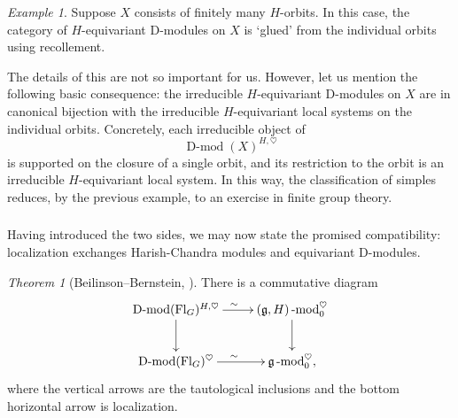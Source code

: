\documentclass[10pt]{amsart}
\newcommand{\sB}{\on{Fl}_G}
\newcommand{\fg}{\mathfrak{g}}
\newcommand{\on}{\operatorname}
\renewcommand{\mod}{\on{-mod}}
\newcommand{\Dmod}{\on{D-mod}}
\theoremstyle{remark}
\newtheorem{ex}[subsubsection]{Example}
\newcommand{\sS}{\mathscr{S}}
\newtheorem{theo}[subsubsection]{Theorem}
\numberwithin{equation}{section}
\renewcommand{\mod}{\operatorname{-mod}}
\begin{document}
	\begin{ex} Suppose $X$ consists of finitely many $H$-orbits. 
	In this case, the category of $H$-equivariant D-modules on $X$ is `glued' 
	from the individual orbits using recollement.
	
	The details of this are not so important for us. However, let us mention 
	the following basic consequence: the irreducible $H$-equivariant 
	D-modules on $X$ are in canonical bijection with the irreducible 
	$H$-equivariant local systems on the individual orbits. Concretely, each 
	irreducible object of $$\Dmod(X)^{H, \heartsuit}$$is supported on the 
	closure of a single orbit, and its restriction to the orbit is an 
	irreducible $H$-equivariant local system. In this way, the classification 
	of simples reduces, by the previous example, to an exercise in finite group 
	theory. 
	
	
	
	\label{e:bigbrain}
	
	

	\end{ex}
	
	
	
	
	
	
	
	\subsubsection{} Having introduced the two sides, we may now state the 
	promised
	compatibility: localization exchanges Harish-Chandra modules and 
	equivariant 
	D-modules.
	
	\begin{theo}[Beilinson--Bernstein, \cite{beilinson-bernstein81}]\label{t:heqv} There is a commutative diagram 
	\[
	\xymatrix{\Dmod(\sB)^{H, \heartsuit} \ar[r]^\sim \ar[d] & (\fg, 
		H)\mod_0^\heartsuit \ar[d]  \\  \Dmod(\sB)^\heartsuit \ar[r]^\sim & 
		\fg\mod_0^\heartsuit,} 
	\]
	where the vertical arrows are the tautological inclusions and the bottom 
	horizontal arrow is localization. 
		\end{theo}
	
\end{document}
